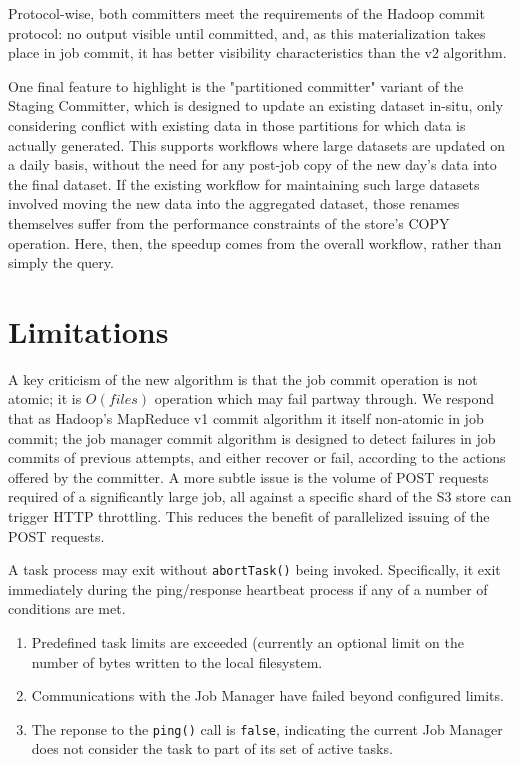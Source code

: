 \documentclass[conference]{IEEEtran}
\begin{document}
Protocol-wise, both committers meet the requirements of the Hadoop commit
protocol: no output visible until committed, and, as this materialization
takes place in job commit, it has better visibility characteristics than
the v2 algorithm.

One final feature to highlight is the "partitioned committer" variant
of the Staging Committer, which is designed to update an existing
dataset in-situ, only considering conflict with existing data in
those partitions for which data is actually generated.
This supports workflows where large datasets are updated on a daily basis,
without the need for any post-job copy of the new day's data into the
final dataset.
If the existing workflow for maintaining such large datasets involved
moving the new data into the aggregated dataset, those renames themselves
suffer from the performance constraints of the store's COPY operation.
Here, then, the speedup comes from the overall workflow, rather than
simply the query.






\section{Limitations}
\label{sec:limitations}

A key criticism of the new algorithm is that the job commit operation is not atomic;
it is $O(files)$ operation which may fail partway through.
We respond that as Hadoop's MapReduce v1 commit algorithm it itself non-atomic in job commit;
the job manager commit algorithm is designed to detect failures in job commits
of previous attempts, and either recover or fail, according to the actions
offered by the committer.
A more subtle issue is the volume of POST requests required of a significantly large job,
all against a specific shard of the S3 store can trigger HTTP throttling.
This reduces the benefit of parallelized issuing of the POST requests.

A task process may exit without \texttt{abortTask()} being invoked.
Specifically, it exit immediately during the ping/response
heartbeat process if any of a number of conditions are met.

\begin{enumerate}
  \item Predefined task limits are exceeded
  (currently an optional limit on the number of bytes written to the local filesystem.
  \item Communications with the Job Manager have failed beyond configured limits.
  \item The reponse to the \texttt{ping()} call is \texttt{false}, indicating the current
  Job Manager does not consider the task to part of its set of active tasks.
\end{enumerate}
\end{document}
